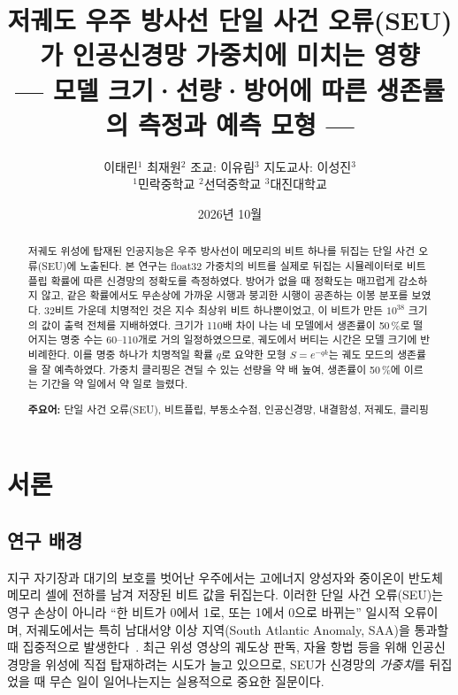 \documentclass[11pt,a4paper]{article}
\title{\texorpdfstring{\LARGE 저궤도 우주 방사선 단일 사건 오류(SEU)가 인공신경망 가중치에 미치는 영향\\[4pt]
\large --- 모델 크기·선량·방어에 따른 생존률의 측정과 예측 모형 ---}{저궤도 우주 방사선 SEU가 인공신경망 가중치에 미치는 영향}}
\author{\texorpdfstring{이태린$^{1}$ \quad 최재원$^{2}$ \quad 조교: 이유림$^{3}$ \quad 지도교사: 이성진$^{3}$\\[2pt]
\small $^{1}$민락중학교 \quad $^{2}$선덕중학교 \quad $^{3}$대진대학교}{이태린, 최재원, 이유림, 이성진}}
\date{2026년 10월}
\begin{document}
\renewcommand{\figurename}{그림}
\renewcommand{\tablename}{표}
\renewcommand{\refname}{참고문헌}
\renewcommand{\abstractname}{초록}
\renewcommand{\appendixname}{부록}
\renewcommand{\lstlistingname}{코드}
\maketitle

\begin{abstract}
\noindent
저궤도 위성에 탑재된 인공지능은 우주 방사선이 메모리의 비트 하나를 뒤집는 단일 사건 오류(SEU)에 노출된다. 본 연구는 float32 가중치의 비트를 실제로 뒤집는 시뮬레이터로 비트플립 확률에 따른 신경망의 정확도를 측정하였다. 방어가 없을 때 정확도는 매끄럽게 감소하지 않고, 같은 확률에서도 무손상에 가까운 시행과 붕괴한 시행이 공존하는 이봉 분포를 보였다. 32비트 가운데 치명적인 것은 지수 최상위 비트 하나뿐이었고, 이 비트가 만든 $10^{38}$ 크기의 값이 출력 전체를 지배하였다. 크기가 110배 차이 나는 네 모델에서 생존률이 50\,\%로 떨어지는 명중 수는 60--110개로 거의 일정하였으므로, 궤도에서 버티는 시간은 모델 크기에 반비례한다. 이를 명중 하나가 치명적일 확률 $q$로 요약한 모형 $S=e^{-qk}$는 궤도 모드의 생존률을 잘 예측하였다. 가중치 클리핑은 견딜 수 있는 선량을 약 \PhalfRatio{}배 높여, 생존률이 50\,\%에 이르는 기간을 약 \PhalfNoneDays{}일에서 약 \PhalfClipDays{}일로 늘렸다.

\medskip
\noindent\textbf{주요어:} 단일 사건 오류(SEU), 비트플립, 부동소수점, 인공신경망, 내결함성, 저궤도, 클리핑
\end{abstract}

\section{서론}

\subsection{연구 배경}
지구 자기장과 대기의 보호를 벗어난 우주에서는 고에너지 양성자와 중이온이 반도체 메모리 셀에 전하를 남겨 저장된 비트 값을 뒤집는다. 이러한 단일 사건 오류(SEU)는 영구 손상이 아니라 ``한 비트가 0에서 1로, 또는 1에서 0으로 바뀌는'' 일시적 오류이며, 저궤도에서는 특히 남대서양 이상 지역(South Atlantic Anomaly, SAA)을 통과할 때 집중적으로 발생한다~\citep{baumann2005,normand1996,barth2003}. 최근 위성 영상의 궤도상 판독, 자율 항법 등을 위해 인공신경망을 위성에 직접 탑재하려는 시도가 늘고 있으므로, SEU가 신경망의 \emph{가중치}를 뒤집었을 때 무슨 일이 일어나는지는 실용적으로 중요한 질문이다.
\end{document}
